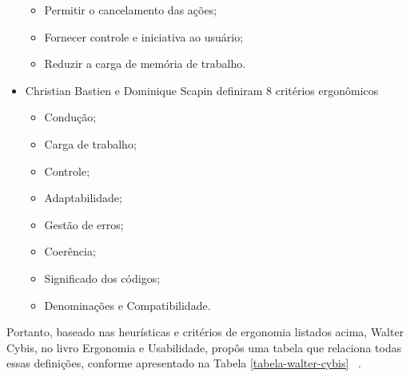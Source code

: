 \begin{itemize}
\begin{itemize}
    \item Permitir o cancelamento das ações;

    \item Fornecer controle e iniciativa ao usuário;

    \item Reduzir a carga de memória de trabalho.

    \end{itemize}

\item Christian Bastien e Dominique Scapin definiram 8 critérios ergonômicos\\ \cite{bastien1993}

    \begin{itemize}

    \item Condução;

    \item Carga de trabalho;

    \item Controle;

    \item Adaptabilidade;

    \item Gestão de erros;

    \item Coerência;

    \item Significado dos códigos;

    \item Denominações e Compatibilidade.

    \end{itemize}

\end{itemize}

Portanto, baseado nas heurísticas e critérios de ergonomia listados acima,  Walter Cybis, no
livro Ergonomia e Usabilidade, propôs uma tabela que relaciona todas essas
definições, conforme apresentado na Tabela \ref{tabela-walter-cybis} ~\cite{cybis2010}.

